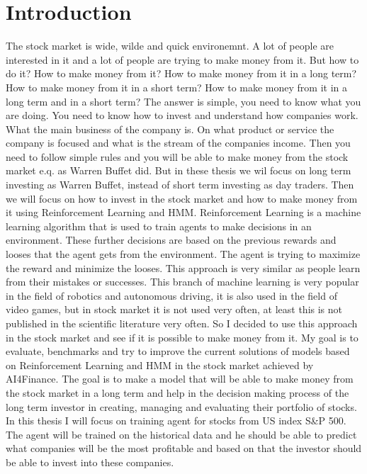 \chapter{Introduction}

The stock market is wide, wilde and quick environemnt.
A lot of people are interested in it and a lot of people are trying to make money from it.
But how to do it?
How to make money from it?
How to make money from it in a long term?
How to make money from it in a short term?
How to make money from it in a long term and in a short term?
The answer is simple, you need to know what you are doing.
You need to know how to invest and understand how companies work.
What the main business of the company is. On what product or service the company is focused
and what is the stream of the companies income. Then you need
to follow simple rules and you will be able to make money from the stock market e.q. as Warren Buffet did.
But in these thesis we wil focus on long term investing as Warren Buffet, instead of short term investing as day traders.
Then we will focus on how to invest in the stock market and how to make money from it using Reinforcement Learning and HMM.
Reinforcement Learning is a machine learning algorithm that is used to train agents to make decisions in an environment.
These further decisions are based on the previous rewards and looses that the agent gets from the environment.
The agent is trying to maximize the reward and minimize the looses.
This approach is very similar as people learn from their mistakes or successes.
This branch of machine learning is very popular in the field of robotics and autonomous driving,
it is also used in the field of video games, but in stock market it is not used very often,
at least this is not published in the scientific literature very often.
So I decided to use this approach in the stock market and see if it is possible to make money from it.
My goal is to evaluate, benchmarks and try to improve the current solutions of models
based on Reinforcement Learning and HMM in the stock market achieved by AI4Finance.
The goal is to make a model that will be able to make money from the stock market in a long term
and help in the decision making process of the long term investor in creating, managing and evaluating
their portfolio of stocks.
In this thesis I will focus on training agent for stocks from US index S\&P 500.
The agent will be trained on the historical data and he should be able to predict
what companies will be the most profitable and based on that the investor should be able
to invest into these companies.
